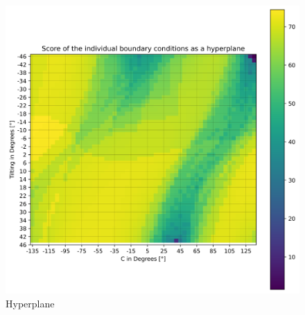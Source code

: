 \begin{figure}[H]
	\centerline{\includegraphics[width=1\textwidth]{figures/best_2D_1.png}}
	\caption{Hyperplane}
	\label{best_2D}
\end{figure}

\newpage
